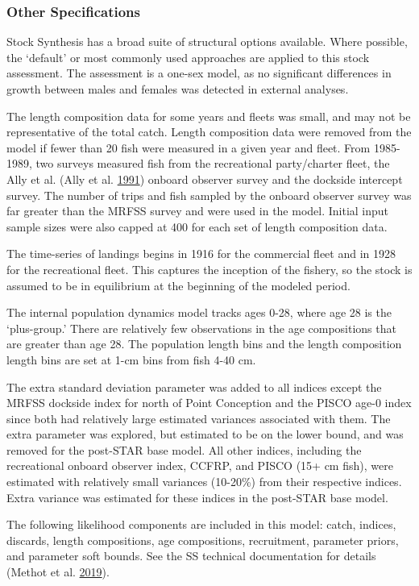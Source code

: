 \documentclass[12pt,]{article}
\begin{document}
\subsubsection{Other Specifications}\label{other-specifications}

Stock Synthesis has a broad suite of structural options available. Where
possible, the `default' or most commonly used approaches are applied to
this stock assessment. The assessment is a one-sex model, as no
significant differences in growth between males and females was detected
in external analyses.

The length composition data for some years and fleets was small, and may
not be representative of the total catch. Length composition data were
removed from the model if fewer than 20 fish were measured in a given
year and fleet. From 1985-1989, two surveys measured fish from the
recreational party/charter fleet, the Ally et al. (Ally et al.
\protect\hyperlink{ref-Ally1991}{1991}) onboard observer survey and the
dockside intercept survey. The number of trips and fish sampled by the
onboard observer survey was far greater than the MRFSS survey and were
used in the model. Initial input sample sizes were also capped at 400
for each set of length composition data.

The time-series of landings begins in 1916 for the commercial fleet and
in 1928 for the recreational fleet. This captures the inception of the
fishery, so the stock is assumed to be in equilibrium at the beginning
of the modeled period.

The internal population dynamics model tracks ages 0-28, where age 28 is
the `plus-group.' There are relatively few observations in the age
compositions that are greater than age 28. The population length bins
and the length composition length bins are set at 1-cm bins from fish
4-40 cm.

The extra standard deviation parameter was added to all indices except
the MRFSS dockside index for north of Point Conception and the PISCO
age-0 index since both had relatively large estimated variances
associated with them. The extra parameter was explored, but estimated to
be on the lower bound, and was removed for the post-STAR base model. All
other indices, including the recreational onboard observer index, CCFRP,
and PISCO (15+ cm fish), were estimated with relatively small variances
(10-20\%) from their respective indices. Extra variance was estimated
for these indices in the post-STAR base model.

The following likelihood components are included in this model: catch,
indices, discards, length compositions, age compositions, recruitment,
parameter priors, and parameter soft bounds. See the SS technical
documentation for details (Methot et al.
\protect\hyperlink{ref-Methot2019}{2019}).
\end{document}
